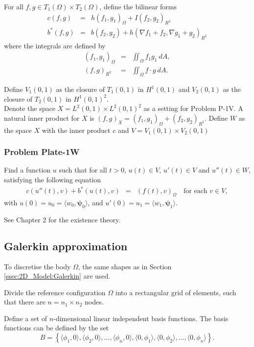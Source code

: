 \documentclass[../../main.tex]{subfiles}
\begin{document}
For all $f,g \in T_1(\Omega)\times T_2(\Omega) $, define the bilinear forms
\begin{eqnarray*}
	c(f,g) & = & h(f_1,g_1)_{\Omega} + I(f_2,g_2)_{R^2} \\
	b^*(f,g) & = & b(f_2,g_2) + h(\nabla f_1 + f_2, \nabla g_1 + g_2)_{R^2}
\end{eqnarray*}
where the integrals are defined by
\begin{eqnarray*}
	(f_1,g_1)_{\Omega} & = & \iint_\Omega f_1 g_1 \ dA,\\
	(f,g)_{R^2} & = & \iint_\Omega f \cdot g \ dA.
\end{eqnarray*}

Define $V_1(0,1)$ as the closure of $T_1(0,1)$ in $H^1(0,1)$ and $V_2(0,1)$ as the closure of $T_2(0,1)$ in $H^1(0,1)^2$.\\

Denote the space $X = L^2(0,1)\times L^2(0,1)^2$ as a setting for Problem P-1V. A natural inner product for $X$ is $(f,g)_X = (f_1,g_1)_{\Omega} + (f_2,g_2)_{R^2}$.  Define $W$ as the space $X$ with the inner product $c$ and $V = V_1(0,1) \times V_2(0,1)$

\subsubsection{Problem Plate-1W}
Find a function $u$ such that for all $t>0$, $u(t) \in V$, $u'(t) \in V$ and $u''(t) \in W$, satisfying the following equation
\begin{eqnarray}
	c(u''(t),v) + b^*(u(t),v) & = & (f(t),v)_{\Omega} \ \ \ \textrm{ for each } v \in V,
\end{eqnarray} with $u(0)= u_0 = \langle w_0, \boldsymbol\psi_0 \rangle$, and $u'(0)= u_1 = \langle w_1, \boldsymbol\psi_1 \rangle$.

See Chapter 2 for the existence theory.

\subsection{Galerkin approximation}
To discretise the body $\Omega$, the same shapes as in Section \ref{ssec:2D_Model:Galerkin} are used.

Divide the reference configuration $\Omega$ into a rectangular grid of elements, such that there are $n = n_1 \times n_2$ nodes.

Define a set of $n$-dimensional linear independent basis functions. The basis functions can be defined by the set $$B = \left\{\langle\phi_1, 0\rangle, \langle\phi_2, 0\rangle,...,\langle\phi_{n}, 0 \rangle,\langle 0,\phi_1\rangle,\langle 0 ,\phi_2\rangle,...,\langle 0,\phi_{n}\rangle \right\}.$$ 
\end{document}
